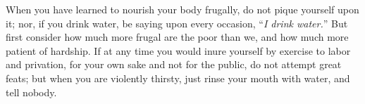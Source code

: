 When you have learned to nourish your body frugally, do not pique
yourself upon it; nor, if you drink water, be saying upon every occasion,
``\emph{I drink water.}'' But first consider how much more frugal are the poor
than we, and how much more patient of hardship. If at any time you would
inure yourself by exercise to labor and privation, for your own sake and
not for the public, do not attempt great feats; but when you are
violently thirsty, just rinse your mouth with water, and tell nobody.
